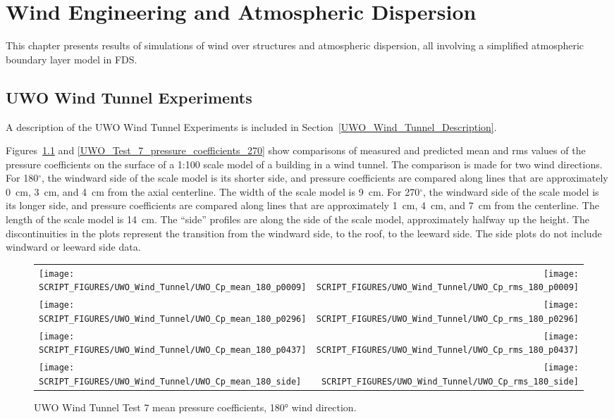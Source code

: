 
\chapter{Wind Engineering and Atmospheric Dispersion}

This chapter presents results of simulations of wind over structures and atmospheric dispersion, all involving a simplified atmospheric boundary layer model in FDS.


\section{UWO Wind Tunnel Experiments}

A description of the UWO Wind Tunnel Experiments is included in Section~\ref{UWO_Wind_Tunnel_Description}. 

Figures~\ref{UWO_Test_7_pressure_coefficients_180} and \ref{UWO_Test_7_pressure_coefficients_270} show comparisons of measured and predicted mean and rms values of the pressure coefficients on the surface of a 1:100 scale model of a building in a wind tunnel. The comparison is made for two wind directions. For 180$^\circ$, the windward side of the scale model is its shorter side, and pressure coefficients are compared along lines that are approximately 0~cm, 3~cm, and 4~cm from the axial centerline. The width of the scale model is 9~cm. For 270$^\circ$, the windward side of the scale model is its longer side, and pressure coefficients are compared along lines that are approximately 1~cm, 4~cm, and 7~cm from the centerline. The length of the scale model is 14~cm. The ``side'' profiles are along the side of the scale model, approximately halfway up the height. The discontinuities in the plots represent the transition from the windward side, to the roof, to the leeward side. The side plots do not include windward or leeward side data.

\begin{figure}[p]
\begin{tabular*}{\textwidth}{l@{\extracolsep{\fill}}r}
\texttt{[image: SCRIPT\_FIGURES/UWO\_Wind\_Tunnel/UWO\_Cp\_mean\_180\_p0009]} &
\texttt{[image: SCRIPT\_FIGURES/UWO\_Wind\_Tunnel/UWO\_Cp\_rms\_180\_p0009]} \\
\texttt{[image: SCRIPT\_FIGURES/UWO\_Wind\_Tunnel/UWO\_Cp\_mean\_180\_p0296]} &
\texttt{[image: SCRIPT\_FIGURES/UWO\_Wind\_Tunnel/UWO\_Cp\_rms\_180\_p0296]} \\
\texttt{[image: SCRIPT\_FIGURES/UWO\_Wind\_Tunnel/UWO\_Cp\_mean\_180\_p0437]} &
\texttt{[image: SCRIPT\_FIGURES/UWO\_Wind\_Tunnel/UWO\_Cp\_rms\_180\_p0437]} \\
\texttt{[image: SCRIPT\_FIGURES/UWO\_Wind\_Tunnel/UWO\_Cp\_mean\_180\_side]} &
\texttt{[image: SCRIPT\_FIGURES/UWO\_Wind\_Tunnel/UWO\_Cp\_rms\_180\_side]}
\end{tabular*}
\caption[UWO Wind Tunnel Test 7 Pressure Coefficients, 180\si{\degree}]{UWO Wind Tunnel Test 7 mean pressure coefficients, 180\si{\degree} wind direction.}
\label{UWO_Test_7_pressure_coefficients_180}
\end{figure}

